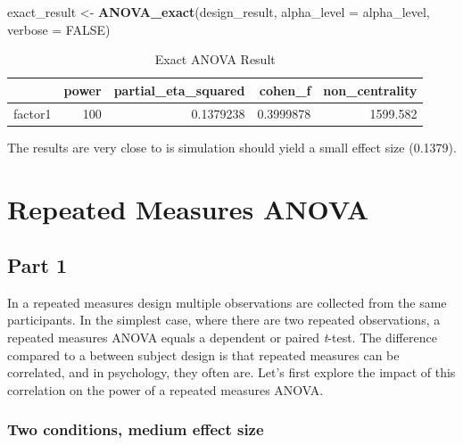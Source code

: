 \documentclass[]{book}
\newenvironment{Shaded}{\begin{snugshade}}{\end{snugshade}}
\newcommand{\DataTypeTok}[1]{\textcolor[rgb]{0.13,0.29,0.53}{#1}}
\newcommand{\KeywordTok}[1]{\textcolor[rgb]{0.13,0.29,0.53}{\textbf{#1}}}
\newcommand{\NormalTok}[1]{#1}
\newcommand{\OtherTok}[1]{\textcolor[rgb]{0.56,0.35,0.01}{#1}}
\newcommand{\StringTok}[1]{\textcolor[rgb]{0.31,0.60,0.02}{#1}}
\begin{document}
\begin{Shaded}
\begin{Highlighting}[]
\NormalTok{exact_result <-}\StringTok{ }\KeywordTok{ANOVA_exact}\NormalTok{(design_result,}
                            \DataTypeTok{alpha_level =}\NormalTok{ alpha_level,}
                            \DataTypeTok{verbose =} \OtherTok{FALSE}\NormalTok{)}
\end{Highlighting}
\end{Shaded}

\begin{table}[!h]

\caption{\label{tab:unnamed-chunk-94}Exact ANOVA Result}
\centering
\begin{tabular}{l|r|r|r|r}
\hline
  & power & partial\_eta\_squared & cohen\_f & non\_centrality\\
\hline
factor1 & 100 & 0.1379238 & 0.3999878 & 1599.582\\
\hline
\end{tabular}
\end{table}

The results are very close to is simulation should yield a small effect size (0.1379).

\hypertarget{repeated-measures-anova}{%
\chapter{Repeated Measures ANOVA}\label{repeated-measures-anova}}

\hypertarget{part-1-1}{%
\section{Part 1}\label{part-1-1}}

In a repeated measures design multiple observations are collected from the same participants. In the simplest case, where there are two repeated observations, a repeated measures ANOVA equals a dependent or paired \emph{t}-test. The difference compared to a between subject design is that repeated measures can be correlated, and in psychology, they often are. Let's first explore the impact of this correlation on the power of a repeated measures ANOVA.

\hypertarget{two-conditions-medium-effect-size}{%
\subsection{Two conditions, medium effect size}\label{two-conditions-medium-effect-size}}
\end{document}
